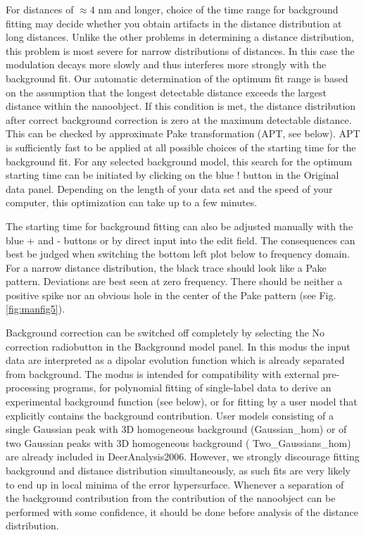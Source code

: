 \documentclass{article}
\begin{document}
For distances of $\approx4$ nm and longer, choice of the time range for background
fitting may decide whether you obtain artifacts in the distance distribution at
long distances. Unlike the other problems in determining a distance distribution,
this problem is most severe for narrow distributions of distances. In this case the
modulation decays more slowly and thus interferes more strongly with the background
fit. Our automatic determination of the optimum fit range is based on
the assumption that the longest detectable distance exceeds the largest distance
within the nanoobject. If this condition is met, the distance distribution after
correct background correction is zero at the maximum detectable distance. This
can be checked by approximate Pake transformation (APT, see below). APT is
sufficiently fast to be applied at all possible choices of the starting time for the
background fit. For any selected background model, this search for the optimum
starting time can be initiated by clicking on the blue {\ttfamily !} button in
the {\ttfamily Original data} panel. Depending on the length of your data set and the
speed of your computer, this optimization can take up to a few minutes.

The starting time for background fitting can also be adjusted manually with
the blue {\ttfamily +} and {\ttfamily -} buttons or by direct input into the edit field. The consequences can best be judged when switching the bottom left plot below to frequency
domain. For a narrow distance distribution, the black trace should look like
a Pake pattern. Deviations are best seen at zero frequency. There should be
neither a positive spike nor an obvious hole in the center of the Pake pattern
(see Fig. \ref{fig:manfig5}).

Background correction can be switched off completely by selecting the {\ttfamily No
correction} radiobutton in the {\ttfamily Background model} panel. In this modus the input data are interpreted as a dipolar evolution function which is already separated from background. The
modus is intended for compatibility with external pre-processing programs,
for polynomial fitting of single-label data to derive an experimental background
function (see below), or for fitting by a user model that explicitly contains the background contribution. User models consisting of a single Gaussian peak with 3D homogeneous background ({\ttfamily Gaussian\_hom}) or of two Gaussian peaks with 3D homogeneous background ({\ttfamily 
Two\_Gaussians\_hom}) are already included in DeerAnalysis2006. However, we strongly discourage fitting background and distance distribution simultaneously, as such fits are very likely to end up in local minima of the error hypersurface. Whenever a separation of the background contribution from the contribution of the nanoobject can be performed with some confidence, it should be done before analysis of the distance distribution.
\end{document}
